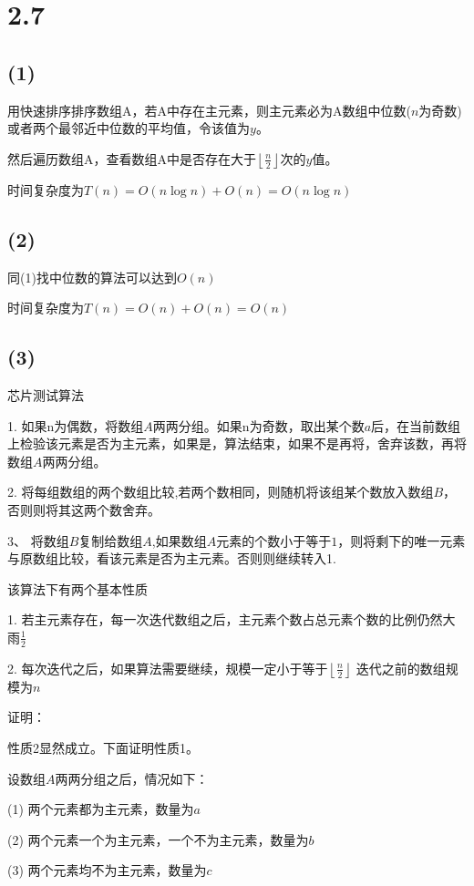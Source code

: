 \documentclass[a4paper]{article}
\begin{document}
\section*{2.7}
\subsection*{(1)}
	用快速排序排序数组A，若A中存在主元素，则主元素必为A数组中位数($n$为奇数)或者两个最邻近中位数的平均值，令该值为$y$。

	然后遍历数组A，查看数组A中是否存在大于$\left \lfloor{\frac{n}{2}}\right \rfloor$次的$y$值。

	时间复杂度为$T(n)=O(n\log n)+O(n)=O(n\log n)$

\subsection*{(2)}
	同(1)找中位数的算法可以达到$O(n)$

	时间复杂度为$T(n)=O(n)+O(n)=O(n)$

\subsection*{(3)}
	芯片测试算法

	1.  如果n为偶数，将数组$A$两两分组。如果n为奇数，取出某个数$a$后，在当前数组上检验该元素是否为主元素，如果是，算法结束，如果不是再将，舍弃该数，再将数组$A$两两分组。

	2. 将每组数组的两个数组比较,若两个数相同，则随机将该组某个数放入数组$B$，否则则将其这两个数舍弃。

	3、 将数组$B$复制给数组$A$,如果数组$A$元素的个数小于等于$1$，则将剩下的唯一元素与原数组比较，看该元素是否为主元素。否则则继续转入1.

	该算法下有两个基本性质
	
	1.  若主元素存在，每一次迭代数组之后，主元素个数占总元素个数的比例仍然大雨$\frac{1}{2}$

	2.  每次迭代之后，如果算法需要继续，规模一定小于等于$\left \lfloor \frac{n}{2}\right \rfloor $ 迭代之前的数组规模为$n$

	证明：

	性质2显然成立。下面证明性质1。

	设数组$A$两两分组之后，情况如下：

		(1)  两个元素都为主元素，数量为$a$

		(2)  两个元素一个为主元素，一个不为主元素，数量为$b$

		(3)  两个元素均不为主元素，数量为$c$
\end{document}
